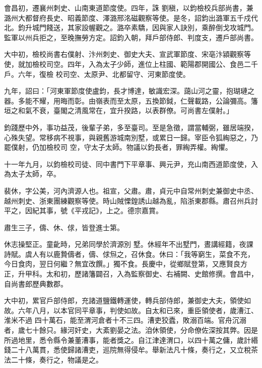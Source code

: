\begin{pinyinscope}
 會昌初，遷襄州刺史、山南東道節度使。四年，誅
 劉稹，以鈞檢校兵部尚書，兼潞州大都督府長史、昭義節度、澤潞邢洺磁觀察等使。是冬，詔鈞出潞軍五千戍代北。鈞升城門餞送，其家設幄觀之。潞卒素驕，因與家人訣別，乘醉倒戈攻城門。監軍以州兵拒之，至晚撫勞方定。詔鈞入朝，拜戶部侍郎、判度支，遷戶部尚書。



 大中初，檢校尚書右僕射、汴州刺史、御史大夫、宣武軍節度、宋亳汴潁觀察等使，就加檢校司空。四年，入為太子少師，進位上柱國、範陽郡開國公、食邑二千戶。六年，復檢
 校司空、太原尹、北都留守、河東節度使。



 九年，詔曰：「河東軍節度使盧鈞，長才博達，敏識宏深。藹山河之靈，抱瑚璉之器。多能不耀，用晦而彰。由嶺表而至太原，五換節鉞，仁聲載路，公論彌高。籓垣之和氣不衰，臺閣之清風常在，宜升揆路，以表群僚。可尚書左僕射。」



 鈞踐歷中外，事功益茂，後輩子弟，多至臺司。至是急徵，謂當輔弼，雖居端揆，心殊失望。常移病不視事，與親舊游城南別墅，或累日一歸。宰臣令狐綯惡之，乃罷僕射，仍加檢校司
 空，守太子太師。物議以鈞長者，罪綯弄權。綯懼。



 十一年九月，以鈞檢校司徒、同中書門下平章事、興元尹，充山南西道節度使，入為太子太師，卒。



 裴休，字公美，河內濟源人也。祖宣，父肅。肅，貞元中自常州刺史兼御史中丞、越州刺史、浙東團練觀察等使。時山賊慄鍠誘山越為亂，陷浙東郡縣。肅召州兵討平之，因紀其事，號《平戎記》，上之。德宗嘉賞。



 肅生三子，儔、休、俅，皆登進士第。



 休志操堅正。童齔時，兄弟同學於濟源別
 墅。休經年不出墅門，晝講經籍，夜課詩賦。虞人有以鹿贄儔者，儔、俅炰之，召休食。休曰：「我等窮生，菜食不充，今日食肉，翌日何繼？無宜改饌。」獨不食。長慶中，從鄉賦登第，又應賢良方正，升甲科。太和初，歷諸籓闢召，入為監察御史、右補闕、史館修撰。會昌中，自尚書郎歷典數郡。



 大中初，累官戶部侍郎，充諸道鹽鐵轉運使，轉兵部侍郎，兼御史大夫，領使如故。六年八月，以本官同平章事，判使如故。自太和已來，重臣領使者，歲漕江、淮米不過
 四十萬石，能至渭河倉者十不三四。漕吏狡蠹，敗溺百端。官舟沉溺者，歲七十餘只。緣河奸史，大紊劉晏之法。洎休領使，分命僚佐深按其弊。因是所過地里，悉令縣令兼董漕事，能者獎之。自江津達渭口，以四十萬之傭，歲計緡錢二十八萬貫，悉使歸諸漕吏，巡院無得侵牟。舉新法凡十條，奏行之，又立稅茶法二十條，奏行之，物議是之。




\end{pinyinscope}
